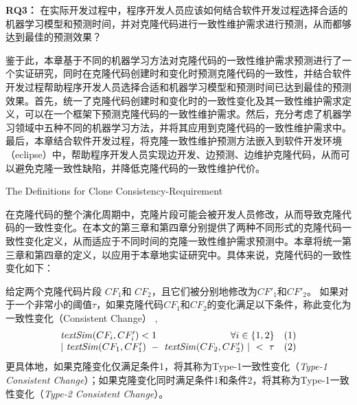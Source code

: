 {\bf RQ3：}
在实际开发过程中，程序开发人员应该如何结合软件开发过程选择合适的机器学习模型和预测时间，并对克隆代码进行一致性维护需求进行预测，从而都够达到最佳的预测效果？

鉴于此，本章基于不同的机器学习方法对克隆代码的一致性维护需求预测进行了一个实证研究，同时在克隆代码创建时和变化时预测克隆代码的一致性，并结合软件开发过程帮助程序开发人员选择合适和机器学习模型和预测时间已达到最佳的预测效果。首先，统一了克隆代码创建时和变化时的一致性变化及其一致性维护需求定义，可以在一个框架下预测克隆代码的一致性维护需求。然后，充分考虑了机器学习领域中五种不同的机器学习方法，并将其应用到克隆代码的一致性维护需求中。最后，本章结合软件开发过程，将克隆一致性维护预测方法嵌入到软件开发环境（eclipse）中，帮助程序开发人员实现边开发、边预测、边维护克隆代码，从而可以避免克隆一致性缺陷，并降低克隆代码的一致性维护代价。

{The Definitions for Clone Consistency-Requirement}

在克隆代码的整个演化周期中，克隆片段可能会被开发人员修改，从而导致克隆代码的一致性变化。在本文的第三章和第四章分别提供了两种不同形式的克隆代码一致性变化定义，从而适应于不同时间的克隆一致性维护需求预测中。本章将统一第三章和第四章的定义，以应用于本章地实证研究中。具体来说，克隆代码的一致性变化如下：\\

\begin{definition}
\label{def-change}
给定两个克隆代码片段 $CF_1$和 $CF_2$，且它们被分别地修改为$CF'_1$和$CF'_2$。 如果对于一个非常小的阈值$\tau$，如果克隆代码$CF_1$和$CF_2$的变化满足以下条件，称此变化为一致性变化（Consistent Change） , 
  \[
  \begin{array}[t]{crl}
    \mathit{textSim}(CF_i, CF'_i) < 1 & \forall i \in \{1,2\} &(1) \\
    \multicolumn{2}{c}{| ~\mathit{textSim}(CF_1,CF'_1)  ~-~ \mathit{textSim}(CF_2,CF'_2) ~| ~< ~ \tau}  & (2)
  \end{array}
  \]
更具体地，如果克隆变化仅满足条件1，将其称为Type-1一致性变化（{\em Type-1 Consistent Change}）；如果克隆变化同时满足条件1和条件2，将其称为Type-1一致性变化（{\em Type-2 Consistent Change}）。
\end{definition}


